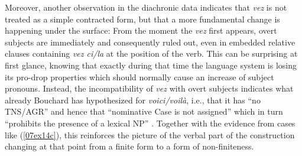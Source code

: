 \documentclass[output=paper,colorlinks,citecolor=brown]{langscibook}
\begin{document}
Moreover, another observation in the diachronic data indicates that \emph{vez} is not treated as a simple contracted form, but that a more fundamental change is happening under the surface: From the moment the \emph{vez}  first appears, overt subjects are immediately and consequently ruled out, even in embedded relative clauses containing \emph{vez ci/la} at the position of the verb. This can be surprising at first glance, knowing that exactly during that time the  language system is losing its pro-drop properties which should normally cause an increase of subject pronouns. Instead, the incompatibility of \emph{vez} with overt subjects indicates what already Bouchard has hypothesized for \emph{voici/voilà}, i.e., that it has ``no TNS/AGR'' and hence that ``nominative Case is not assigned'' which in turn ``prohibits the presence of a lexical NP'' \citep[93]{bouchard1988}. Together with the evidence from cases like (\ref{07ex14c}), this reinforces the picture of the verbal part of the  construction changing at that point from a finite form to a form of non-finiteness.
\end{document}

